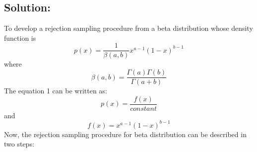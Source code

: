 \documentclass[12pt,a4paper]{article}
\begin{document}
\subsection{Solution: }
To develop a rejection sampling procedure from a beta distribution whose density function is
\begin{equation}
    p(x) = \frac{1}{\beta(a,b)}x^{a-1}(1-x)^{b-1}
\end{equation}
where 
\begin{equation*}
    \beta(a,b) = \frac{\Gamma(a)\Gamma(b)}{\Gamma(a+b)}
\end{equation*}
The equation 1 can be written as:
\begin{equation}
    p(x) = \frac{f(x)}{constant}
\end{equation}
and
\begin{equation}
    f(x) = x^{a-1}(1-x)^{b-1}
\end{equation}
Now, the rejection sampling procedure for beta distribution can be described in two steps:
\end{document}
